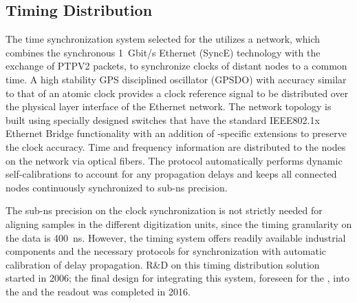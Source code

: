 \subsection{Timing Distribution}
\label{sec:fddp-tpc-elec-wr}
The time synchronization system selected for the  utilizes a  network, which combines the synchronous \SI{1}{Gbit/s} Ethernet (SyncE) technology with the exchange of PTPV2 packets, to synchronize clocks of distant nodes to a common time. A high stability GPS disciplined oscillator (GPSDO) with  accuracy similar to that of an atomic clock provides a clock reference signal to be distributed over the physical layer interface of the  Ethernet network. The network topology is built using specially designed switches that have the standard IEEE802.1x Ethernet Bridge functionality with an addition of -specific extensions to preserve the clock accuracy. Time and frequency information are distributed to the nodes on the  network via optical fibers. The  protocol automatically performs dynamic self-calibrations to account for any propagation delays and keeps all connected nodes continuously synchronized to sub-ns precision. 

The sub-ns %
precision on the clock synchronization is not strictly needed for aligning samples in the different  digitization units, since the %
timing granularity on the data is \SI{400}{ns}. However, the  timing system offers readily available industrial components and the necessary protocols %
for synchronization with automatic calibration of delay propagation. %
R\&D on this timing distribution solution started in 2006; the final design for integrating this system, foreseen for the , into the  and the  readout was completed in 2016. 

